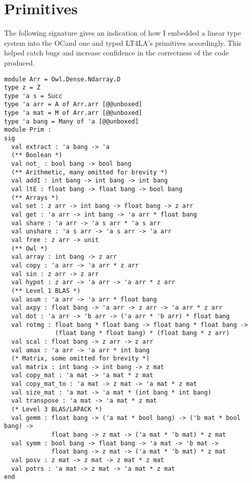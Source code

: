 \chapter{Primitives}\label{chap:primitives}

The following signature gives an indication of how I embedded a linear type
system into the OCaml one and typed LT4LA's primitives accordingly. This helped
catch bugs and increase confidence in the correctness of the code produced.

\begin{verbatim}
module Arr = Owl.Dense.Ndarray.D
type z = Z
type 'a s = Succ
type 'a arr = A of Arr.arr [@@unboxed]
type 'a mat = M of Arr.arr [@@unboxed]
type 'a bang = Many of 'a [@@unboxed]
module Prim :
sig
  val extract : 'a bang -> 'a
  (** Boolean *)
  val not_ : bool bang -> bool bang
  (** Arithmetic, many omitted for brevity *)
  val addI : int bang -> int bang -> int bang
  val ltE : float bang -> float bang -> bool bang
  (** Arrays *)
  val set : z arr -> int bang -> float bang -> z arr
  val get : 'a arr -> int bang -> 'a arr * float bang
  val share : 'a arr -> 'a s arr * 'a s arr
  val unshare : 'a s arr -> 'a s arr -> 'a arr
  val free : z arr -> unit
  (** Owl *)
  val array : int bang -> z arr
  val copy : 'a arr -> 'a arr * z arr
  val sin : z arr -> z arr
  val hypot : z arr -> 'a arr -> 'a arr * z arr
  (** Level 1 BLAS *)
  val asum : 'a arr -> 'a arr * float bang
  val axpy : float bang -> 'a arr -> z arr -> 'a arr * z arr
  val dot : 'a arr -> 'b arr -> ('a arr * 'b arr) * float bang
  val rotmg : float bang * float bang -> float bang * float bang ->
              (float bang * float bang) * (float bang * z arr)
  val scal : float bang -> z arr -> z arr
  val amax : 'a arr -> 'a arr * int bang
  (* Matrix, some omitted for brevity *)
  val matrix : int bang -> int bang -> z mat
  val copy_mat : 'a mat -> 'a mat * z mat
  val copy_mat_to : 'a mat -> z mat -> 'a mat * z mat
  val size_mat : 'a mat -> 'a mat * (int bang * int bang)
  val transpose : 'a mat -> 'a mat * z mat
  (* Level 3 BLAS/LAPACK *)
  val gemm : float bang -> ('a mat * bool bang) -> ('b mat * bool bang) ->
             float bang -> z mat -> ('a mat * 'b mat) * z mat
  val symm : bool bang -> float bang -> 'a mat -> 'b mat ->
             float bang -> z mat -> ('a mat * 'b mat) * z mat
  val posv : z mat -> z mat -> z mat * z mat
  val potrs : 'a mat -> z mat -> 'a mat * z mat
end
\end{verbatim}

\clearpage%
\ottall%
